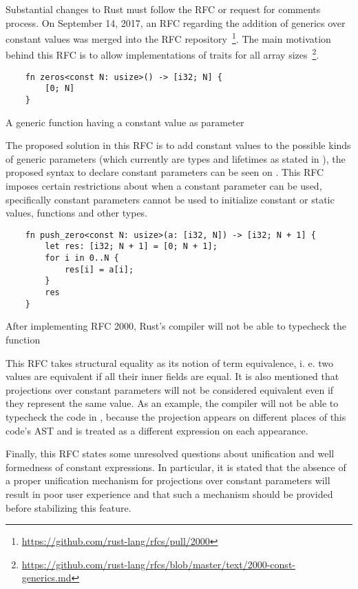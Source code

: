 Substantial changes to Rust must follow the RFC or request for comments
process.  On September 14, 2017, an RFC regarding the addition of generics over
constant values was merged into the RFC
repository~\footnote{\url{https://github.com/rust-lang/rfcs/pull/2000}}. The
main motivation behind this RFC is to allow implementations of traits for all
array
sizes~\footnote{\url{https://github.com/rust-lang/rfcs/blob/master/text/2000-const-generics.md}}. 

\begin{listing}[h]
	\begin{verbatim}
    fn zeros<const N: usize>() -> [i32; N] {
        [0; N]
    }
	\end{verbatim}
    \caption{A generic function having a constant value as parameter}
  \label{lst:const_generics}
\end{listing}

The proposed solution in this RFC is to add constant values to the possible
kinds of generic parameters (which currently are types and lifetimes as stated
in ), the proposed syntax to declare constant
parameters can be seen on . This RFC imposes certain
restrictions about when a constant parameter can be used, specifically constant
parameters cannot be used to initialize constant or static values,
functions and other types.

\begin{listing}[H]
	\begin{verbatim}
    fn push_zero<const N: usize>(a: [i32, N]) -> [i32; N + 1] {
        let res: [i32; N + 1] = [0; N + 1];
        for i in 0..N {
            res[i] = a[i];
        }
        res
    }
	\end{verbatim}
  \caption{After implementing RFC 2000, Rust's compiler will not be able to
  typecheck the function }
  \label{lst:uncheckable_code}
\end{listing}

This RFC takes structural equality as its notion of term equivalence, i. e. two
values are equivalent if all their inner fields are equal. It is also mentioned
that projections over constant parameters will not be considered equivalent even
if they represent the same value. As an example, the compiler will not be able
to typecheck the code in , because the
projection  appears on different places of this code's AST and is
treated as a different expression on each appearance.

Finally, this RFC states some unresolved questions about unification and well
formedness of constant expressions. In particular, it is stated that the absence
of a proper unification mechanism for projections over constant parameters will
result in poor user experience and that such a mechanism should be provided
before stabilizing this feature.
